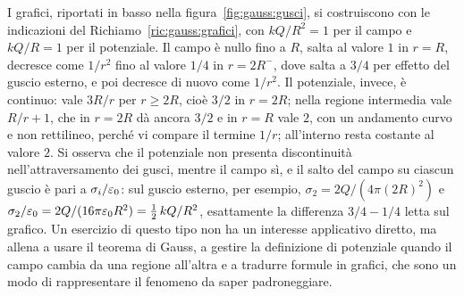 \documentclass[11pt,a4paper]{article}
\begin{document}
I grafici, riportati in basso nella figura~\ref{fig:gauss:gusci}, si costruiscono con le indicazioni del Richiamo~\ref{ric:gauss:grafici}, con $kQ/R^2=1$ per il campo e $kQ/R=1$ per il potenziale. Il campo è nullo fino a $R$, salta al valore $1$ in $r=R$, decresce come $1/r^2$ fino al valore $1/4$ in $r=2R^-$, dove salta a $3/4$ per effetto del guscio esterno, e poi decresce di nuovo come $1/r^2$. Il potenziale, invece, è continuo: vale $3R/r$ per $r\ge2R$, cioè $3/2$ in $r=2R$; nella regione intermedia vale $R/r+1$, che in $r=2R$ dà ancora $3/2$ e in $r=R$ vale $2$, con un andamento curvo e non rettilineo, perché vi compare il termine $1/r$; all'interno resta costante al valore $2$. Si osserva che il potenziale non presenta discontinuità nell'attraversamento dei gusci, mentre il campo sì, e il salto del campo su ciascun guscio è pari a $\sigma_i/\varepsilon_0$: sul guscio esterno, per esempio, $\sigma_2=2Q/(4\pi(2R)^2)$ e $\sigma_2/\varepsilon_0=2Q/(16\pi\varepsilon_0 R^2)=\tfrac12\,kQ/R^2$, esattamente la differenza $3/4-1/4$ letta sul grafico. Un esercizio di questo tipo non ha un interesse applicativo diretto, ma allena a usare il teorema di Gauss, a gestire la definizione di potenziale quando il campo cambia da una regione all'altra e a tradurre formule in grafici, che sono un modo di rappresentare il fenomeno da saper padroneggiare.
\end{document}
